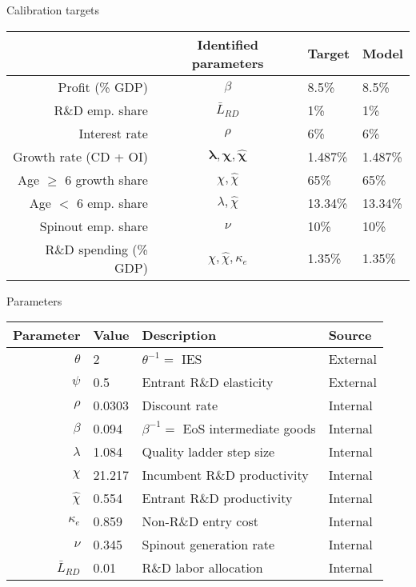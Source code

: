 \documentclass[english,usenames,dvipsnames]{beamer}
\begin{document}
\begin{frame}{Calibration targets}\label{calibration_targets}
\begin{table}[]
	\centering
	\label{calibration_targets}
	\small
	\begin{tabular}{rcll}
		\toprule \toprule
		& Identified parameters & Target & Model \tabularnewline
		\midrule
		Profit (\% GDP) & $\beta$ & 8.5\% & 8.5\% 
		\tabularnewline
		R\&D emp. share & $\bar{L}_{RD}$ & 1\% & 1\% 
		\tabularnewline
		Interest rate & $\rho$ & 6\% & 6\% 
		\tabularnewline
		Growth rate (CD + OI) & $\mathbf{\lambda, \chi, \hat{\chi}}$ & 1.487\% & 1.487\%
		\tabularnewline		
		Age $\ge$ 6 growth share & $\chi, \hat{\chi}$  & 65\% & 65\%
		\tabularnewline
		Age $<$ 6 emp. share  & $\lambda, \hat{\chi}$ & 13.34\% & 13.34\%
		\tabularnewline
		Spinout emp. share &$\nu$  & 10\% & 10\%
		\tabularnewline
		R\&D spending (\% GDP) & $\chi, \hat{\chi}, \kappa_e$  & 1.35\% & 1.35\%
		\tabularnewline
		\bottomrule
	\end{tabular}
\end{table}
\end{frame}


\begin{frame}{Parameters}\label{parameters}
\begin{table}[]
	\footnotesize
	\centering
	\label{calibration_parameters}
	\begin{tabular}{rlll}
		\toprule \toprule
		Parameter & Value & Description & Source \tabularnewline
		\midrule
		$\theta$ & 2 & $\theta^{-1} = $ IES & External
		\tabularnewline
		$\psi$ & 0.5 & Entrant R\&D elasticity & External \tabularnewline
		$\rho$ & 0.0303 & Discount rate  & Internal \tabularnewline
		$\beta$ & 0.094 & $\beta^{-1} = $ EoS intermediate goods & Internal \tabularnewline 
		$\lambda$ & 1.084 & Quality ladder step size & Internal
		\tabularnewline
		$\chi$ & 21.217 & Incumbent R\&D productivity & Internal
		\tabularnewline
		$\hat{\chi}$ & 0.554 & Entrant R\&D productivity & Internal \tabularnewline 
		$\kappa_e$ & 0.859 & Non-R\&D entry cost & Internal \tabularnewline
		$\nu$ & 0.345 & Spinout generation rate  & Internal \tabularnewline
		$\bar{L}_{RD}$ & 0.01 & R\&D labor allocation  & Internal \tabularnewline
		\bottomrule
	\end{tabular}
\end{table}
\hyperlink{identification}{} 
\end{frame}
\end{document}
